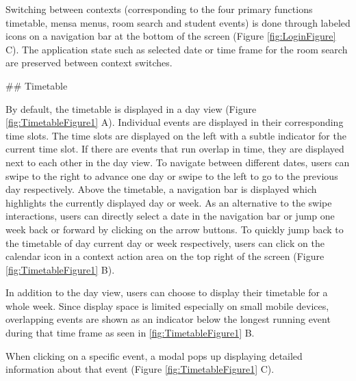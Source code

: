 \begin{markdown}
Switching between contexts (corresponding to the four primary functions timetable, mensa menus, room search and student events) is done through labeled icons on a navigation bar at the bottom of the screen (Figure \ref{fig:LoginFigure} C). The application state such as selected date or time frame for the room search are preserved between context switches.

\newpage

## Timetable

By default, the timetable is displayed in a day view (Figure \ref{fig:TimetableFigure1} A). Individual events are displayed in their corresponding time slots. The time slots are displayed on the left with a subtle indicator for the current time slot. If there are events that run overlap in time, they are displayed next to each other in the day view. To navigate between different dates, users can swipe to the right to advance one day or swipe to the left to go to the previous day respectively. Above the timetable, a navigation bar is displayed which highlights the currently displayed day or week. As an alternative to the swipe interactions, users can directly select a date in the navigation bar or jump one week back or forward by clicking on the arrow buttons. To quickly jump back to the timetable of day current day or week respectively, users can click on the calendar icon in a context action area on the top right of the screen (Figure \ref{fig:TimetableFigure1} B).

In addition to the day view, users can choose to display their timetable for a whole week. Since display space is limited especially on small mobile devices, overlapping events are shown as an indicator below the longest running event during that time frame as seen in \ref{fig:TimetableFigure1} B.

When clicking on a specific event, a modal pops up displaying detailed information about that event (Figure \ref{fig:TimetableFigure1} C).

\bigskip


\end{markdown}
